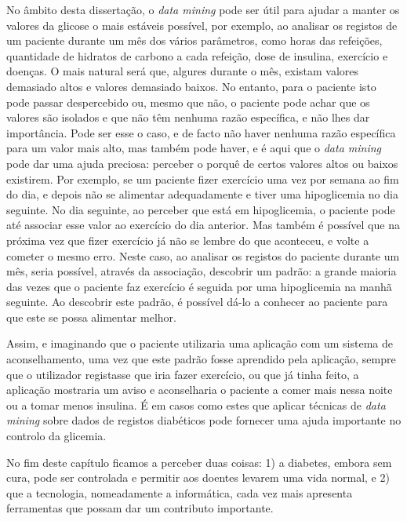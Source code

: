No âmbito desta dissertação, o \textit{data mining} pode ser útil para ajudar a manter os valores da glicose o mais estáveis possível, por exemplo, ao analisar os registos de um paciente durante um mês dos vários parâmetros, como horas das refeições, quantidade de hidratos de carbono a cada refeição, dose de insulina, exercício e doenças. O mais natural será que, algures durante o mês, existam valores demasiado altos e valores demasiado baixos. 
No entanto, para o paciente isto pode passar despercebido ou, mesmo que não, o paciente pode achar que os valores são isolados e que não têm nenhuma razão específica, e não lhes dar importância. Pode ser esse o caso, e de facto não haver nenhuma razão específica para um valor mais alto, mas também pode haver, e é aqui que o \textit{data mining} pode dar uma ajuda preciosa:  perceber o porquê de certos valores altos ou baixos existirem. Por exemplo, se um paciente fizer exercício uma vez por semana ao fim do dia, e depois não se alimentar adequadamente e tiver uma hipoglicemia no dia seguinte. No dia seguinte, ao perceber que está em hipoglicemia, o paciente pode até associar esse valor ao exercício do dia anterior. Mas também é possível que na próxima vez que fizer exercício já não se lembre do que aconteceu, e volte a cometer o mesmo erro. 
Neste caso, ao analisar os registos do paciente durante um mês, seria possível, através da associação, descobrir um padrão: a grande maioria das vezes que o paciente faz exercício é seguida por uma hipoglicemia na manhã seguinte. Ao descobrir este padrão, é possível dá-lo a conhecer ao paciente para que este se possa alimentar melhor.

Assim, e imaginando que o paciente utilizaria uma aplicação com um sistema de aconselhamento, uma vez que este padrão fosse aprendido pela aplicação, sempre que o utilizador registasse que iria fazer exercício, ou que já tinha feito, a aplicação mostraria um aviso e aconselharia o paciente a comer mais nessa noite ou a tomar menos insulina. É em casos como estes que aplicar técnicas de \textit{data mining} sobre dados de registos diabéticos pode fornecer uma ajuda importante no controlo da glicemia.\newline

No fim deste capítulo ficamos a perceber duas coisas: 1) a diabetes, embora sem cura, pode ser controlada e permitir aos doentes levarem uma vida normal, e 2) que a tecnologia, nomeadamente a informática, cada vez mais apresenta ferramentas que possam dar um contributo importante. 

